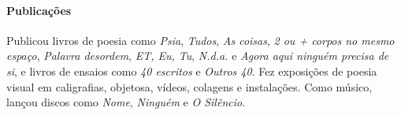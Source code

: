 \documentclass[11pt]{extarticle}
\begin{document}

\paragraph{Publicações} Publicou livros de poesia como \emph{Psia}, \emph{Tudos}, 
\emph{As coisas}, \emph{2 ou + corpos no mesmo espaço}, \emph{Palavra desordem}, 
\emph{ET, Eu, Tu}, \emph{N.d.a.} e \emph{Agora aqui ninguém precisa de si}, 
e livros de ensaios como \emph{40 escritos} e \emph{Outros 40}.  
Fez exposições de poesia visual em caligrafias, objetosa, vídeos, colagens e instalações. 
Como músico, lançou discos como \emph{Nome}, \emph{Ninguém} e \emph{O Silêncio}.
\end{document}
